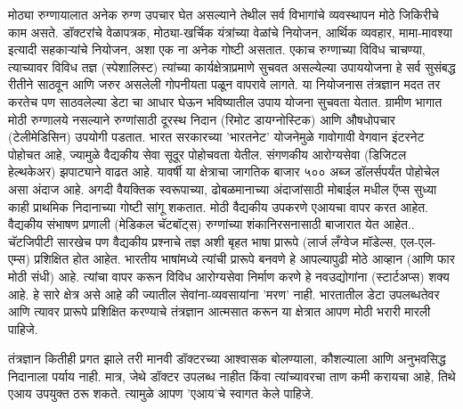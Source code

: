 मोठ्या रुग्णायालात अनेक रुग्ण उपचार घेत असल्याने तेथील सर्व विभागांचे व्यवस्थापन मोठे जिकिरीचे काम असते. डॉक्टरांचे वेळापत्रक, मोठ्या-खर्चिक यंत्रांच्या वेळांचे नियोजन, आर्थिक व्यवहार, मामा-मावश्या इत्यादी सहकाऱ्यांचे नियोजन, अशा एक ना अनेक गोष्टी असतात. एकाच रुग्णाच्या विविध चाचण्या, त्याच्यावर विविध तज्ञ (स्पेशालिस्ट) त्यांच्या कार्यक्षेत्राप्रमाणे सुचवत असल्येल्या उपाययोजना हे सर्व सुसंबद्ध रीतीने साठवून आणि जरुर असलेली गोपनीयता पळून वापरावे लागते. या नियोजनास तंत्रज्ञान मदत तर करतेच पण साठवलेल्या डेटा चा आधार घेऊन भविष्यातील उपाय योजना सुचवता येतात. ग्रामीण भागात मोठी रुग्णालये नसल्याने रुग्णांसाठी दूरस्थ निदान (रिमोट डायग्नोस्टिक) आणि औषधोपचार (टेलीमेडिसिन) उपयोगी पडतात. भारत सरकारच्या 'भारतनेट' योजनेमुळे गावोगावी वेगवान इंटरनेट पोहोचत आहे, ज्यामुळे वैद्यकीय सेवा सूदूर पोहोचवता येतील. संगणकीय आरोग्यसेवा (डिजिटल हेल्थकेअर) झपाट्याने वाढत आहे. यावर्षी या क्षेत्राचा जागतिक बाजार ५०० अब्ज डॉलर्सपर्यंत पोहोचेल असा अंदाज आहे. अगदी वैयक्तिक स्वरूपाच्या, ढोबळमानाच्या अंदाजांसाठी मोबाईल मधील ऍप्स सुध्या काही प्राथमिक निदानाच्या गोष्टी सांगू शकतात. मोठी वैद्यकीय उपकरणे एआयचा वापर करत आहेत. वैद्यकीय संभाषण प्रणाली (मेडिकल चॅटबॉट्स) रुग्णांच्या शंकानिरसनासाठी बाजारात येत आहेत.. चॅटजिपीटी सारखेच पण वैद्यकीय प्रश्नाचे तज्ञ अशी बृहत भाषा प्रारूपे (लार्ज लँग्वेज मॉडेल्स, एल-एल-एम्स) प्रशिक्षित होत आहेत. भारतीय भाषांमध्ये त्यांची प्रारूपे बनवणे हे आपल्यापुढी मोठे आव्हान (आणि फार मोठी संधी) आहे. त्यांचा वापर करून विविध आरोग्यसेवा निर्माण करणे हे नवउद्योगांना (स्टार्टअप्स) शक्य आहे. हे सारे क्षेत्र असे आहे की ज्यातील सेवांना-व्यवसायांना 'मरण' नाही. भारतातील डेटा उपलब्धतेवर आणि त्यावर प्रारूपे प्रशिक्षित करण्याचे तंत्रज्ञान आत्मसात करून या क्षेत्रात आपण मोठी भरारी मारली पाहिजे. 

तंत्रज्ञान कितीही प्रगत झाले तरी मानवी डॉक्टरच्या आश्वासक बोलण्याला, कौशल्याला आणि अनुभवसिद्ध निदानाला पर्याय नाही. मात्र, जेथे डॉक्टर उपलब्ध नाहीत किंवा त्यांच्यावरचा ताण कमी करायचा आहे, तिथे एआय उपयुक्त ठरू शकते. त्यामुळे आपण 'एआय'चे स्वागत केले पाहिजे.